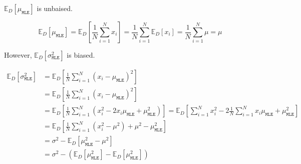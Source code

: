 \(\mathbb{E}_{D}\left[\mu_{\mathtt{MLE}}\right]\)  is unbaised.

\begin{equation}
	\mathbb{E}_{D}\left[\mu_{\mathtt{MLE}}\right] =   \mathbb{E}_{D}\left[\frac{1}{N} \sum_{i=1}^{N} x_i\right] = \frac{1}{N} \sum_{i=1}^{N} \mathbb{E}_{D}\left[x_i\right] = \frac{1}{N} \sum_{i=1}^{N} \mu = \mu
\end{equation}

However, \(\mathbb{E}_{D}\left[\sigma_{\mathtt{MLE}}^2\right]\) is biased.

\begin{align}
	\mathbb{E}_{D}\left[\sigma_{\mathtt{MLE}}^2\right] & = \mathbb{E}_{D}\left[\frac{1}{N} \sum_{i=1}^{N} \left(x_i - \mu_{\mathtt{MLE}}\right)^2\right]                                                                                                                                                             \\
	                                                   & = \mathbb{E}_{D}\left[\frac{1}{N} \sum_{i=1}^{N}  \left(x_i - \mu_{\mathtt{MLE}}\right)^2\right]                                                                                                                                                            \\
	                                                   & = \mathbb{E}_{D}\left[\frac{1}{N} \sum_{i=1}^{N}  \left(x_i^2 - 2x_i \mu_{\mathtt{MLE}} + \mu_{\mathtt{MLE}}^2\right) \right] =  \mathbb{E}_{D}\left[\sum_{i=1}^{N} x_i^2 - 2 \frac{1}{N}\sum_{i=1}^{N}x_i \mu_{\mathtt{MLE}} + \mu_{\mathtt{MLE}}^2\right] \\
	                                                   & = \mathbb{E}_{D}\left[\frac{1}{N}\sum_{i=1}^{N} \left(x_i^2 - \mu^2\right) + \mu^2 - \mu_{\mathtt{MLE}}^2 \right]                                                                                                                                           \\
	                                                   & = \sigma^2 - \mathbb{E}_{D} \left[ \mu_{\mathtt{MLE}}^2 - \mu^2\right]                                                                                                                                                                                      \\
	                                                   & = \sigma^2 -  \left(\mathbb{E}_{D} \left[\mu_{\mathtt{MLE}}^2\right] - \mathbb{E}_{D} \left[\mu_{\mathtt{MLE}}^2\right] \right)                                                                                                                             \\

\end{align}
